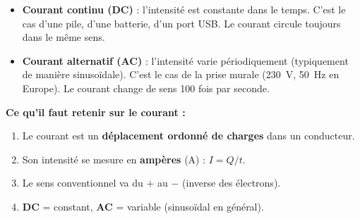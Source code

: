 \documentclass[12pt,a4paper,twoside]{book}
\begin{document}
\begin{itemize}
\item \textbf{Courant continu (DC)} : l'intensité est constante dans le temps. C'est le cas d'une pile, d'une batterie, d'un port USB. Le courant circule toujours dans le même sens.

\item \textbf{Courant alternatif (AC)} : l'intensité varie périodiquement (typiquement de manière sinusoïdale). C'est le cas de la prise murale (\SI{230}{V}, \SI{50}{Hz} en Europe). Le courant change de sens 100 fois par seconde.
\end{itemize}

\begin{center}
\end{center}

\begin{retenir}
\textbf{Ce qu'il faut retenir sur le courant :}
\begin{enumerate}[nosep]
\item Le courant est un \textbf{déplacement ordonné de charges} dans un conducteur.
\item Son intensité se mesure en \textbf{ampères} (A) : $I = Q/t$.
\item Le sens conventionnel va du $+$ au $-$ (inverse des électrons).
\item \textbf{DC} = constant, \textbf{AC} = variable (sinusoïdal en général).
\end{enumerate}
\end{retenir}

\end{document}
